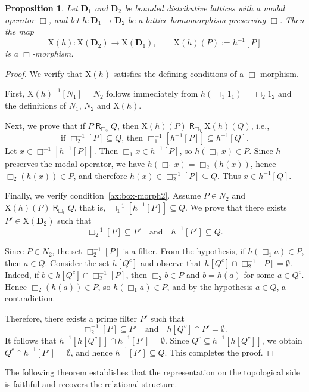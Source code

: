 \documentclass{article}
\newtheorem{proposition}[theorem]{Proposition}
\DeclareMathOperator{\R}{\mathsf{R}}
\newcommand{\D}{\mathbf{D}}
\begin{document}
\begin{proposition}
\label{prop:Xh-box-morphism}
Let $\D_1$ and $\D_2$ be bounded distributive lattices with a modal operator $\Box$, and let $h \colon \D_1 \to \D_2$ be a lattice homomorphism preserving $\Box$. Then the map
\[
\mathrm{X}(h) \colon \mathrm{X}(\D_2) \to \mathrm{X}(\D_1), \qquad \mathrm{X}(h)(P) := h^{-1}[P]
\]
is a $\Box$-morphism.
\end{proposition}
\begin{proof}
We verify that $\mathrm{X}(h)$ satisfies the defining conditions of a $\Box$-morphism.

First, $\mathrm{X}(h)^{-1}[N_1] = N_2$ follows immediately from $h(\Box_1 1_1) = \Box_2 1_2$ and the definitions of $N_1$, $N_2$ and $\mathrm{X}(h)$.

Next, we prove that if $P\R_{\Box_2}Q$, then $\mathrm{X}(h)(P)\R_{\Box_1} \mathrm{X}(h)(Q)$, i.e., 
\[
\text{if }\Box_2^{-1}[P] \subseteq Q\text{, then }\Box_1^{-1}[h^{-1}[P]] \subseteq h^{-1}[Q].
\]
Let $x \in \Box_1^{-1}[h^{-1}[P]]$. Then $\Box_1 x \in h^{-1}[P]$, so $h(\Box_1 x) \in P$. Since $h$ preserves the modal operator, we have $h(\Box_1 x) = \Box_2(h(x))$, hence $\Box_2(h(x)) \in P$, and therefore $h(x) \in \Box_2^{-1}[P] \subseteq Q$. Thus $x \in h^{-1}[Q]$.

Finally, we verify condition~\eqref{ax:box-morph2}. Assume $P \in N_2$ and $\mathrm{X}(h)(P) \R_{\Box_1} Q$, that is, $\Box_1^{-1}[h^{-1}[P]] \subseteq Q$.
We prove that there exists $P' \in \mathrm{X}(\D_2)$ such that
\[
\Box_2^{-1}[P] \subseteq P' \quad \text{and} \quad h^{-1}[P'] \subseteq Q.
\]

Since $P \in N_2$, the set $\Box_2^{-1}[P]$ is a filter. From the hypothesis, if $h(\Box_1 a) \in P$, then $a \in Q$. Consider the set $h[Q^c]$ and observe that $h[Q^c] \cap \Box_2^{-1}[P] = \emptyset$. Indeed, if $b \in h[Q^c] \cap \Box_2^{-1}[P]$, then $\Box_2 b \in P$ and $b = h(a)$ for some $a \in Q^c$. Hence $\Box_2(h(a)) \in P$, so $h(\Box_1 a) \in P$, and by the hypothesis $a \in Q$, a contradiction.

Therefore, there exists a prime filter $P'$ such that
\[
\Box_2^{-1}[P] \subseteq P' \quad \text{and} \quad h[Q^c] \cap P' = \emptyset.
\]
It follows that $h^{-1}[h[Q^c]] \cap h^{-1}[P'] = \emptyset$. Since $Q^c \subseteq h^{-1}[h[Q^c]]$, we obtain $Q^c \cap h^{-1}[P'] = \emptyset$, and hence $h^{-1}[P'] \subseteq Q$. This completes the proof.
\end{proof}

The following theorem establishes that the representation on the topological side is faithful and recovers the relational structure.
\end{document}
